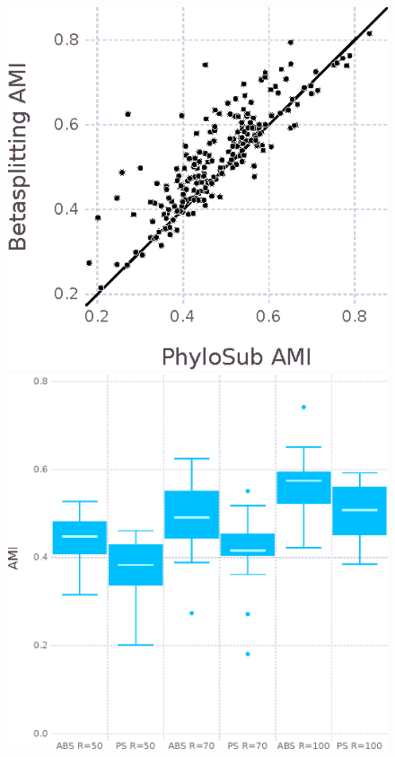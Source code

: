 \documentclass{bioinfo}
\begin{document}
\begin{figure}
\centering
\includegraphics[width=0.9\columnwidth]{../figures/phylosub_betasplit_ami_scatter.eps}
\includegraphics[width=0.9\columnwidth]{../figures/ami_boxplot_N_R.eps}

\end{figure}
\end{document}
